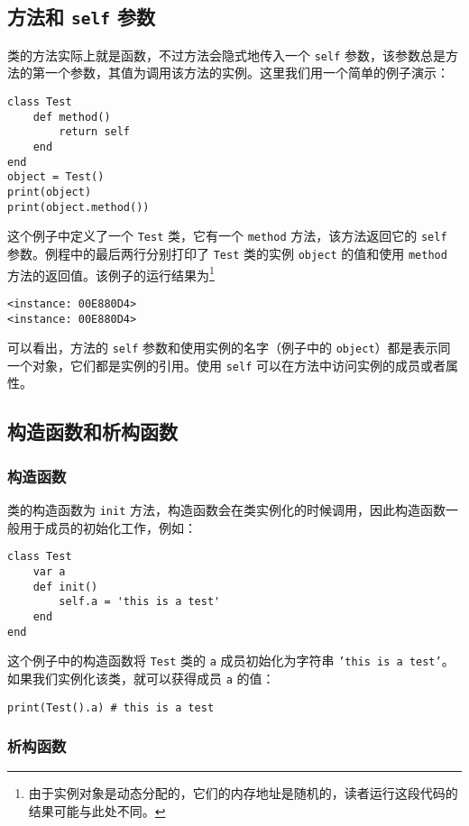 \subsection{方法和 \texttt{self} 参数}

类的方法实际上就是函数，不过方法会隐式地传入一个 \texttt{self} 参数，该参数总是方法的第一个参数，其值为调用该方法的实例。这里我们用一个简单的例子演示：
\begin{lstlisting}[language=berry, numbers=none]
class Test
    def method()
        return self
    end
end
object = Test()
print(object)
print(object.method())
\end{lstlisting}
这个例子中定义了一个 \texttt{Test} 类，它有一个 \texttt{method} 方法，该方法返回它的 \texttt{self} 参数。例程中的最后两行分别打印了 \texttt{Test} 类的实例 \texttt{object} 的值和使用 \texttt{method} 方法的返回值。该例子的运行结果为\footnote{由于实例对象是动态分配的，它们的内存地址是随机的，读者运行这段代码的结果可能与此处不同。}
\begin{lstlisting}[numbers=none]
<instance: 00E880D4>
<instance: 00E880D4>
\end{lstlisting}
可以看出，方法的 \texttt{self} 参数和使用实例的名字（例子中的 \texttt{object}）都是表示同一个对象，它们都是实例的引用。使用 \texttt{self} 可以在方法中访问实例的成员或者属性。

\subsection{构造函数和析构函数}

\subsubsection{构造函数}

类的构造函数为 \texttt{init} 方法，构造函数会在类实例化的时候调用，因此构造函数一般用于成员的初始化工作，例如：
\begin{lstlisting}[language=berry, numbers=none]
class Test
    var a
    def init()
        self.a = 'this is a test'
    end
end
\end{lstlisting}
这个例子中的构造函数将 \texttt{Test} 类的 \texttt{a} 成员初始化为字符串 \texttt{'this is a test'}。如果我们实例化该类，就可以获得成员 \texttt{a} 的值：
\begin{lstlisting}[language=berry, numbers=none]
print(Test().a) # this is a test
\end{lstlisting}

\subsubsection{析构函数}

